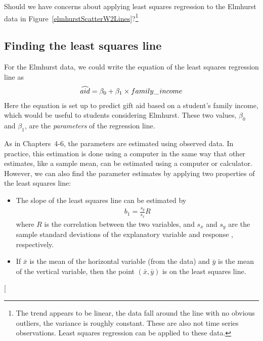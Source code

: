 \begin{exercise}
Should we have concerns about applying least squares regression to the Elmhurst data in Figure~\ref{elmhurstScatterW2Lines}?\footnote{The trend appears to be linear, the data fall around the line with no obvious outliers, the variance is roughly constant. These are also not time series observations. Least squares regression can be applied to these data.}
\end{exercise}


\textC{\newpage}


\subsection{Finding the least squares line}
\label{findingTheLeastSquaresLineSection}

For the Elmhurst data, we could write the equation of the least squares regression line as
\begin{eqnarray*}
\widehat{aid} = \beta_0 + \beta_{1}\times family\_\hspace{0.3mm}income
\end{eqnarray*}
Here the equation is set up to predict gift aid based on a student's family income, which would be useful to students considering Elmhurst. These two values, $\beta_0$ and $\beta_1$, are the \emph{parameters} of the regression line.

As in Chapters~4-6, the parameters are estimated using observed data. In practice, this estimation is done using a computer in the same way that other estimates, like a sample mean, can be estimated using a computer or calculator. However, we can also find the parameter estimates by applying two properties of the least squares line:
\begin{itemize}
\item The slope of the least squares line can be estimated by
\begin{eqnarray}
b_1 = \frac{s_y}{s_x} R
\label{slopeOfLSRLine}
\end{eqnarray}
where $R$ is the correlation between the two variables, and $s_x$ and $s_y$ are the sample standard deviations of the explanatory variable %
and response%
, respectively.
\item If $\bar{x}$ is the mean of the horizontal variable (from the data) and $\bar{y}$ is the mean of the vertical variable, then the point $(\bar{x}, \bar{y})$ is on the least squares line.
\end{itemize}
\marginpar[\raggedright\vspace{0.5mm}

